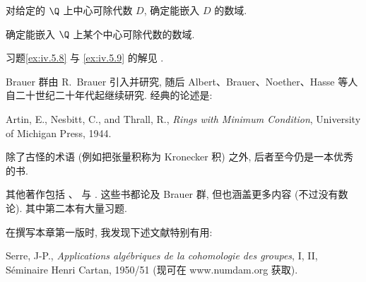 \begin{exercise}\label{ex:iv.5.8}
对给定的 $\Q$ 上中心可除代数 $D$, 确定能嵌入 $D$ 的数域.
\end{exercise}

\begin{exercise}\label{ex:iv.5.9}
确定能嵌入 $\Q$ 上某个中心可除代数的数域.

习题\ref{ex:iv.5.8} 与 \ref{ex:iv.5.9} 的解见 .
\end{exercise}

\begin{NOTES}\label{note:iv.5}
Brauer 群由 R.~Brauer 引入并研究, 随后 Albert、Brauer、Noether、Hasse 等人自二十世纪二十年代起继续研究. 经典的论述是:

Artin, E., Nesbitt, C., and Thrall, R., \emph{Rings with Minimum Condition}, University of Michigan Press, 1944.

除了古怪的术语 (例如把张量积称为 Kronecker 积) 之外, 后者至今仍是一本优秀的书.

其他著作包括 \cite{Blanchard1972}、\cite{FarbDennis1993} 与 \cite{Herstein1968}. 这些书都论及 Brauer 群, 但也涵盖更多内容 (不过没有数论). 其中第二本有大量习题.

在撰写本章第一版时, 我发现下述文献特别有用:

Serre, J-P., \emph{Applications alg\'ebriques de la cohomologie des groupes}, I, II, S\'eminaire Henri Cartan, 1950/51 (现可在 www.numdam.org 获取).
\end{NOTES}
